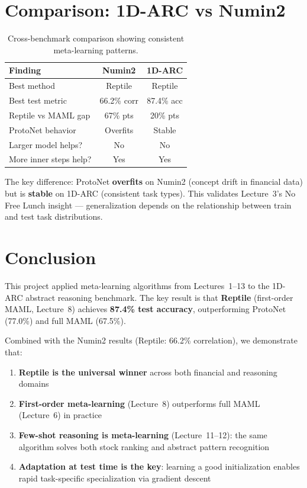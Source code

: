 \documentclass[11pt,a4paper]{article}
\begin{document}
\section{Comparison: 1D-ARC vs Numin2}

\begin{table}[H]
\centering
\caption{Cross-benchmark comparison showing consistent meta-learning patterns.}
\begin{tabular}{lcc}
\toprule
\textbf{Finding} & \textbf{Numin2} & \textbf{1D-ARC} \\
\midrule
Best method & Reptile & Reptile \\
Best test metric & 66.2\% corr & 87.4\% acc \\
Reptile vs MAML gap & 67\% pts & 20\% pts \\
ProtoNet behavior & Overfits & Stable \\
Larger model helps? & No & No \\
More inner steps help? & Yes & Yes \\
\bottomrule
\end{tabular}
\end{table}

The key difference: ProtoNet \textbf{overfits} on Numin2 (concept drift in financial data) but is \textbf{stable} on 1D-ARC (consistent task types). This validates Lecture~3's No Free Lunch insight --- generalization depends on the relationship between train and test task distributions.

\section{Conclusion}

This project applied meta-learning algorithms from Lectures~1--13 to the 1D-ARC abstract reasoning benchmark. The key result is that \textbf{Reptile} (first-order MAML, Lecture~8) achieves \textbf{87.4\% test accuracy}, outperforming ProtoNet (77.0\%) and full MAML (67.5\%).

Combined with the Numin2 results (Reptile: 66.2\% correlation), we demonstrate that:
\begin{enumerate}[nosep]
    \item \textbf{Reptile is the universal winner} across both financial and reasoning domains
    \item \textbf{First-order meta-learning} (Lecture~8) outperforms full MAML (Lecture~6) in practice
    \item \textbf{Few-shot reasoning is meta-learning} (Lecture~11--12): the same algorithm solves both stock ranking and abstract pattern recognition
    \item \textbf{Adaptation at test time is the key}: learning a good initialization enables rapid task-specific specialization via gradient descent
\end{enumerate}
\end{document}
